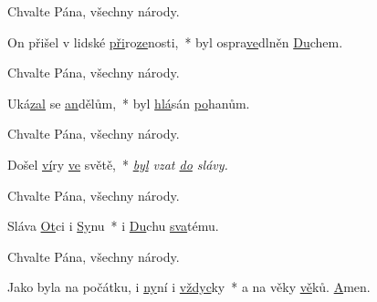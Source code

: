 \begin{psalmus}

 Chvalte Pána, všechny národy.

On přišel v lidské \underline{při}ro\-\underline{ze}nos\-ti,~*
byl o\-spra\-\underline{ve}dl\-něn \underline{Du}chem.

 Chvalte Pána, všechny národy.

Uká\underline{zal} se \underline{an}\-dě\-lům,~*
byl \underline{hlá}\-sán \underline{po}\-ha\-nům.

 Chvalte Pána, všechny národy.

Došel \underline{ví}\-ry \underline{ve} světě,~*
\textit{\underline{byl} vzat \underline{do} slávy.}

 Chvalte Pána, všechny národy.

Sláva \underline{Ot}\-ci i \underline{Sy}\-nu~*
i \underline{Du}\-chu \underline{sva}\-té\-mu.

 Chvalte Pána, všechny národy.

Jako byla na počátku, i \underline{ny}\-ní i \underline{vždyc}\-ky~*
a na věky \underline{vě}\-ků. \underline{A}\-men.
\end{psalmus}
